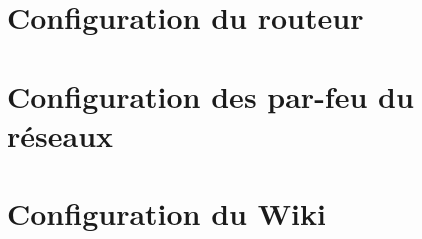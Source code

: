 \documentclass{article}
\begin{document}

\section{Configuration du routeur}



\section{Configuration des par-feu du réseaux}



\section{Configuration du Wiki}

\end{document}
